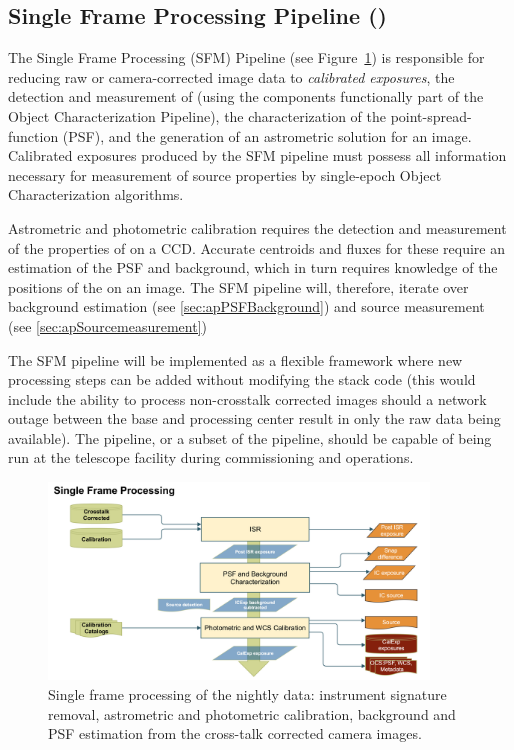 \subsection{Single Frame Processing Pipeline (\wbsSFM)}
\label{sec:apSingleFrameProcessing}

The Single Frame Processing (SFM) Pipeline (see Figure~\ref{fig:apSFM}) is responsible for reducing raw or camera-corrected image data to \emph{calibrated exposures}, the detection and measurement of \Sources (using the components functionally  part of the Object Characterization Pipeline), the characterization of the point-spread-function (PSF), and the generation of an astrometric solution for an image. Calibrated exposures produced by the SFM pipeline must possess all information necessary for measurement of source properties by single-epoch Object Characterization algorithms.

Astrometric and photometric calibration requires the detection and measurement of the properties of \Sources on a CCD. Accurate centroids and fluxes for these \Sources require an estimation of the PSF and background, which in turn requires knowledge of the positions of the \Sources on an image. The SFM pipeline will, therefore, iterate over background estimation (see \ref{sec:apPSFBackground}) and source measurement (see \ref{sec:apSourcemeasurement})

The SFM pipeline will be implemented as a flexible framework where new processing steps can be added without modifying the stack code (this would include the ability to process non-crosstalk corrected images should a network outage between the base and processing center result in  only the raw data being available). The pipeline, or a subset of the pipeline, should be capable of being run at the telescope facility during commissioning and operations.

\begin{figure}[th]
\begin{center}
\includegraphics[width=0.9\textwidth]{figures/SFM.png}
\caption{\label{fig:apSFM} Single frame processing of the nightly data: instrument signature removal, astrometric and photometric calibration, background and PSF estimation from the cross-talk corrected camera images.}
\end{center}
\end{figure}

